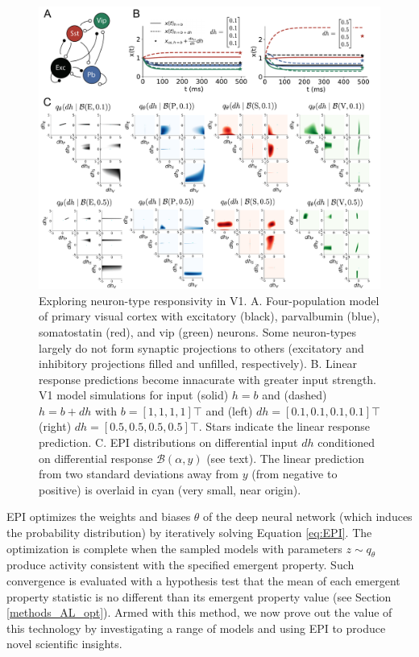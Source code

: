 \documentclass[11pt]{article}
\begin{document}
\begin{figure}
\begin{center}
\includegraphics[scale=0.55]{figures/fig2/fig2.pdf}
\end{center}
\caption{Exploring neuron-type responsivity in V1.  A. Four-population model of primary visual cortex with excitatory (black), parvalbumin (blue), somatostatin (red), and vip (green) neurons.   Some neuron-types largely do not form synaptic projections to others  (excitatory and inhibitory projections filled and unfilled, respectively).  B. Linear response predictions become innacurate with greater input strength.  V1 model simulations for input (solid) $h=b$ and (dashed) $h = b + dh$ with $b = \left[1, 1, 1, 1\right]\top$ and (left) $dh = \left[0.1, 0.1, 0.1, 0.1\right]\top$ (right) $dh = \left[0.5, 0.5, 0.5, 0.5\right]\top$.  Stars indicate the linear response prediction.  C. EPI distributions on differential input $dh$ conditioned on differential response $\mathcal{B}(\alpha, y)$ (see text). The linear prediction from two standard deviations away from $y$ (from negative to positive) is overlaid in cyan (very small, near origin). }
\end{figure}

EPI optimizes the weights and biases $\theta$ of the deep neural network (which induces the probability distribution) by iteratively solving Equation \ref{eq:EPI}. The optimization is complete when the sampled models with parameters $z \sim q_\theta$ produce activity consistent with the specified emergent property.  Such convergence is evaluated with a hypothesis test that the mean of each emergent property statistic is no different than its emergent property value (see Section \ref{methods_AL_opt}). Armed with this method, we now prove out the value of this technology by investigating a range of models and using EPI to produce novel scientific insights.
\end{document}
